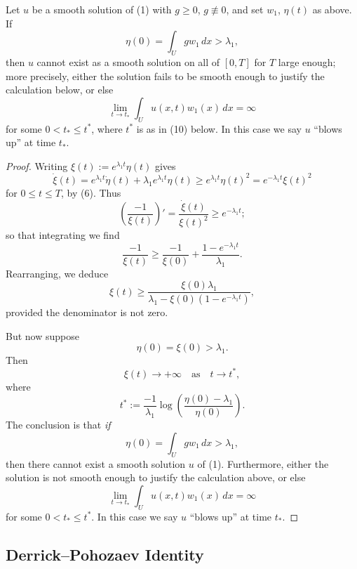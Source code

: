 \begin{theorem}
\label{thm:blowup-large-data}
Let $u$ be a smooth solution of (1) with $g \geq 0$, $g \not\equiv 0$, and set $w_1$, $\eta(t)$ as above. If
\[
\eta(0) = \int_U gw_1 \, dx > \lambda_1,
\]
then $u$ cannot exist as a smooth solution on all of $[0,T]$ for $T$ large enough; more precisely, either the solution fails to be smooth enough to justify the calculation below, or else
\[
\lim_{t \to t_*} \int_U u(x,t)w_1(x) \, dx = \infty
\]
for some $0 < t_* \le t^*$, where $t^*$ is as in (10) below. In this case we say $u$ ``blows up'' at time $t_*$.
\end{theorem}
\begin{proof}
Writing $\xi(t) := e^{\lambda_1 t}\eta(t)$ gives
\[
\dot{\xi}(t) = e^{\lambda_1 t}\dot{\eta}(t) + \lambda_1 e^{\lambda_1 t}\eta(t) \geq e^{\lambda_1 t}\eta(t)^2 = e^{-\lambda_1 t}\xi(t)^2
\]
for $0 \leq t \leq T$, by (6). Thus
\[
\left(\frac{-1}{\xi(t)}\right)' = \frac{\dot{\xi}(t)}{\xi(t)^2} \geq e^{-\lambda_1 t};
\]
so that integrating we find
\[
\frac{-1}{\xi(t)} \geq \frac{-1}{\xi(0)} + \frac{1 - e^{-\lambda_1 t}}{\lambda_1}.
\]
Rearranging, we deduce
\[
\xi(t) \geq \frac{\xi(0)\lambda_1}{\lambda_1 - \xi(0)(1 - e^{-\lambda_1 t})},
\tag{7}
\]
provided the denominator is not zero.

But now suppose
\[
\eta(0) = \xi(0) > \lambda_1.
\tag{8}
\]
Then
\[
\xi(t) \to +\infty \quad \text{as} \quad t \to t^*,
\tag{9}
\]
where
\[
t^* := \frac{-1}{\lambda_1} \log\left(\frac{\eta(0) - \lambda_1}{\eta(0)}\right).
\tag{10}
\]
The conclusion is that \textit{if}
\[
\eta(0) = \int_U gw_1 \, dx > \lambda_1,
\]
then there cannot exist a smooth solution $u$ of (1). Furthermore, either the solution is not smooth enough to justify the calculation above, or else
\[
\lim_{t \to t_*} \int_U u(x,t)w_1(x) \, dx = \infty
\]
for some $0 < t_* \leq t^*$. In this case we say $u$ ``blows up'' at time $t_*$.
\end{proof}

\subsection{Derrick--Pohozaev Identity}
\label{sec:derrick-pohozaev-identity}

